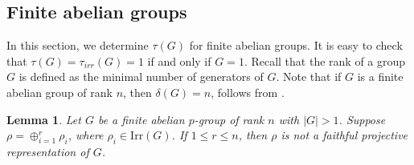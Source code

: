 \documentclass[a4paper,11pt]{amsart}
\numberwithin{equation}{section}
\numberwithin{equation}{subsection}
\newtheorem{lemma}[theorem]{Lemma}
\begin{document}
\subsection{Finite abelian groups} \label{abelian}
In this section, we determine $\tau(G)$ for finite abelian groups. It is easy to check that $\tau(G) = \tau_{irr}(G) = 1$ if and only if $G= 1$. 
Recall that the rank of a group $G$ is defined as the minimal number of generators of $G$. Note that if $G$ is a finite abelian group of rank $n$, then $\delta(G)= n$, follows from \cite[Lemma 3.4]{moreto}.    

\begin{lemma} \label{1dim direct sum in abelian group}
	Let $G$ be a finite abelian $p$-group of rank $n$ with $|G|>1$. Suppose $\rho= \oplus_{i=1}^r \rho_i$, where $\rho_i \in \mathrm{Irr}(G)$. If $1 \leq r \leq n$, then $\rho$ is not a faithful projective representation of $G$.   
\end{lemma}
\end{document}
